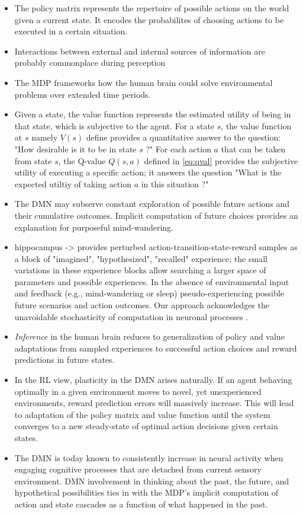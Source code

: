 \documentclass{article} %
\begin{document}
\begin{itemize}
  \item The policy matrix represents the repertoire of possible actions
  on the world given a current state. It encodes the probabilites of
  choosing actions to be executed in a certain situation.
  \item Interactions between external and internal sources of
  information are probably commonplace during perception
  \item The MDP frameworks how the human brain could solve
  environmental problems over extended time periods.
  \item Given a state, the value function represents the estimated utility of
  being in that state, which is subjective to the agent.
  For a state $s$, the value function at $s$ namely $V(s)$ define provides a quantitative answer to the question:
  "How desirable is it to be in state $s$ ?"
  For each action $a$ that can be taken from state $s$,
  the Q-value  $Q(s, a)$ defined in \eqref{eq:qval} provides the subjective
  utility of executing a specific action; it answers the question
  "What is the expected utiltiy of taking action $a$ in this situation ?"
  \item The DMN may subserve
  constant exploration of possible future actions and their
  cumulative outcomes. Implicit computation of future choices
  provides an explanation for purposeful mind-wandering.
  \item hippocampus -> provides perturbed action-transition-state-reward samples
  as a block of "imagined", "hypothesized", "recalled" experience;
  the small variations in these experience blocks allow searching
  a larger space of parameters and possible experiences.
  In the absence of environmental input and feedback
  (e.g., mind-wandering or sleep) pseudo-experiencing possible
  future scenarios and action outcomes.
  Our approach acknowledges the unavoidable stochasticity of
  computation in neuronal processes \citep{faisal2008noise}.
  \item
  \textit{Inference} in the human brain reduces to generalization of
  policy and value adaptations from sampled experiences to
  successful action choices and reward predictions in future states.
  \item In the RL view, plasticity in the DMN arises naturally.
  If an agent behaving optimally in a given environment moves
  to novel, yet unexperienced environments, reward prediction errors will
  massively increase. This will lead to adaptation of the policy matrix
  and value function until the system converges to a
  new steady-state of optimal action decisions given certain states.
  \item The DMN is today known to consistently increase in neural
  activity when engaging cognitive processes that are detached from
  current sensory environment. DMN involvement in thinking about the past,
  the future, and hypothetical possibilities ties in with the
  MDP's implicit computation of action and state cascades as a function
  of what happened in the past.
\end{itemize}
\end{document}

